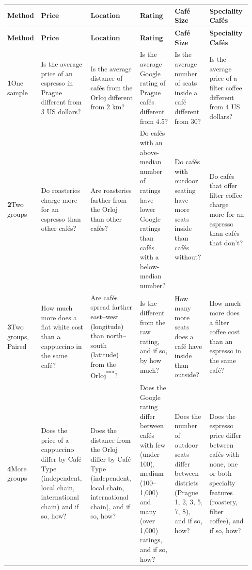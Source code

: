 \documentclass[11pt,a4paper]{article}
\begin{document}
\begin{landscape}
{\footnotesize
\setlength{\tabcolsep}{4pt}
\renewcommand{\arraystretch}{1.15}
\begin{longtable}{@{}>{\RaggedRight\arraybackslash}p{3.0cm}*{5}{>{\RaggedRight\arraybackslash}p{3.85cm}}@{}}
\toprule
\textbf{Method} & \textbf{Price} & \textbf{Location} & \textbf{Rating} & \textbf{Caf\'e Size} & \textbf{Speciality Caf\'es} \\
\midrule
\endfirsthead
\toprule
\textbf{Method} & \textbf{Price} & \textbf{Location} & \textbf{Rating} & \textbf{Caf\'e Size} & \textbf{Speciality Caf\'es} \\
\midrule
\endhead
\bottomrule
\endlastfoot
\textbf{1}\enspace One sample & Is the average price of an espresso in Prague different from 3 US dollars? & Is the average distance of caf\'es from the Orloj different from 2 km? & Is the average Google rating of Prague caf\'es different from 4.5? & Is the average number of seats inside a caf\'e different from 30? & Is the average price of a filter coffee different from 4 US dollars? \\
\midrule[\lightrulewidth]
\textbf{2}\enspace Two groups & Do roasteries charge more for an espresso than other caf\'es? & Are roasteries farther from the Orloj than other caf\'es? & Do caf\'es with an above-median number of ratings have lower Google ratings than caf\'es with a below-median number? & Do caf\'es with outdoor seating have more seats inside than caf\'es without? & Do caf\'es that offer filter coffee charge more for an espresso than caf\'es that don't? \\
\midrule[\lightrulewidth]
\textbf{3}\enspace Two groups, Paired & How much more does a flat white cost than a cappuccino in the same caf\'e? & Are caf\'es spread farther east--west (longitude) than north--south (latitude) from the Orloj\textsuperscript{***}? & Is the \AR{} different from the raw rating, and if so, by how much? & How many more seats does a caf\'e have inside than outside? & How much more does a filter coffee cost than an espresso in the same caf\'e? \\
\midrule[\lightrulewidth]
\textbf{4}\enspace More groups & Does the price of a cappuccino differ by Caf\'e Type (independent, local chain, international chain) and if so, how? & Does the distance from the Orloj differ by Caf\'e Type (independent, local chain, international chain), and if so, how? & Does the Google rating differ between caf\'es with few (under 100), medium (100--1,000) and many (over 1,000) ratings, and if so, how? & Does the number of outdoor seats differ between districts (Prague 1, 2, 3, 5, 7, 8), and if so, how? & Does the espresso price differ between caf\'es with none, one or both specialty features (roastery, filter coffee), and if so, how? \\

\end{longtable}}
\end{landscape}
\end{document}
